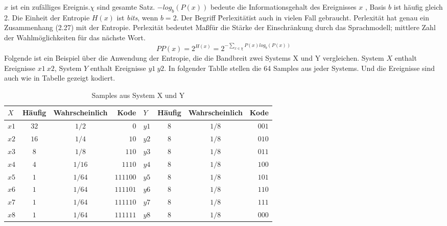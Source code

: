 $x$ ist ein zuf\"alliges Ereignis.$\chi$ sind gesamte Satz. $-log_{b}(P(x))$ bedeute die Informationsgehalt des Ereignisses $x$ , Basis $b$ ist h\"aufig gleich 2. Die Einheit der Entropie $H(x)$ ist \emph{bits}, wenn $b=2$.
Der Begriff \"Perlexit\"at\" ist auch in vielen Fall gebraucht. Perlexit\"at hat genau ein Zusammenhang (2.27) mit der Entropie. Perlexit\"at bedeutet Ma\ss f\"ur die St\"arke der Einschr\"ankung durch das Sprachmodell; mittlere Zahl der Wahlm\"oglichkeiten f\"ur das n\"achste Wort.
\begin{equation}
\label{equation:bewertung_02}
PP(x)=2^{H(x)}=2^{-\sum_{x\in\chi}P(x)log_{b}(P(x))}
\end{equation}
Folgende ist ein Beispiel \"uber die Anwendung der Entropie, die die Bandbreit zwei Systems X und Y vergleichen. System $X$ enthalt Ereignisse $x1~x2$, System $Y$ enthalt Ereignisse $y1~y2$. In folgender Tablle stellen die 64 Samples aus jeder Systems. Und die Ereignisse sind auch wie in Tabelle gezeigt kodiert.
\begin{table}[h]
  \begin{center}
    \begin{tabular}{lccrlccr}
      \toprule
      \bf $X$ & \bf H\"aufig & \bf Wahrscheinlich & \bf Kode 
   	& \bf $Y$ & \bf H\"aufig & \bf Wahrscheinlich & \bf Kode\\    
      \midrule     
      $x1$ 		&  $32$ 		 	& $1/2$  							& $0$	
    & $y1$		&  $8$ 		 		& $1/8$  							& $001$	\\
      $x2$ 		&  $16$ 			& $1/4$  							& $10$
    & $y2$		&  $8$ 		 		& $1/8$  							& $010$	\\
     	$x3$ 		&  $8$ 		 		& $1/8$  							& $110$	
    & $y3$		&  $8$ 		 		& $1/8$  							& $011$	\\
      $x4$ 		&  $4$ 				& $1/16$  						& $1110$
    & $y4$		&  $8$ 		 		& $1/8$  							& $100$	\\
     	$x5$ 		&  $1$ 		 		& $1/64$   						& $111100$	
    & $y5$		&  $8$ 		 		& $1/8$  							& $101$	\\
      $x6$ 		&  $1$ 				& $1/64$  						& $111101$
   	& $y6$		&  $8$ 		 		& $1/8$  							& $110$	\\
     	$x7$ 		&  $1$ 		 		& $1/64$  						& $111110$	
    & $y7$		&  $8$ 		 		& $1/8$  							& $111$	\\
      $x8$ 		&  $1$ 				& $1/64$  						& $111111$
    & $y8$		&  $8$ 		 		& $1/8$  							& $000$	\\     
      \bottomrule
    \end{tabular}
  \end{center}
\caption{Samples aus System X und Y}
\label{tab:table_2}
\end{table}

